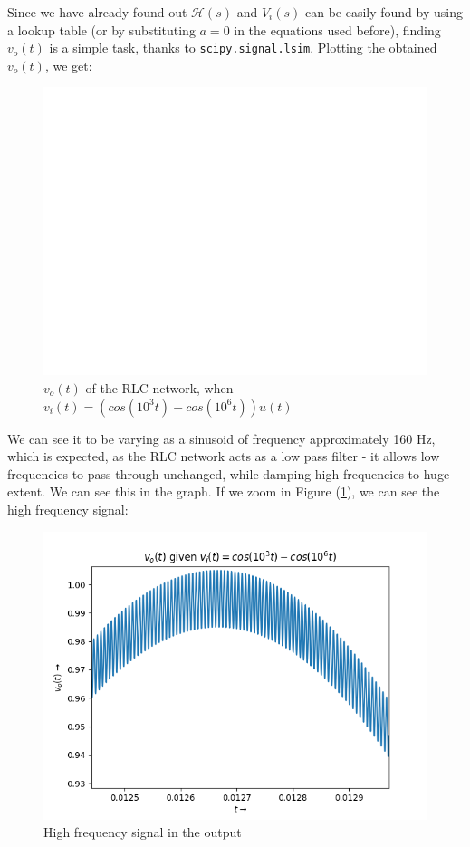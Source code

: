 \documentclass[11pt, a4paper, twoside]{article}
\begin{document}
    Since we have already found out $\mathcal{H}(s)$ and $V_i(s)$ can be easily found by using a lookup table (or by substituting $a=0$ in the equations used before), finding $v_o(t)$ is a simple task, thanks to \texttt{scipy.signal.lsim}. Plotting the obtained $v_o(t)$, we get:
    \begin{figure}[H]
        \centering
        \includegraphics[scale=0.7]{Fig 6(a).png}
        \caption{$v_o(t)$ of the RLC network, when $v_i(t) = (cos(10^3t)-cos(10^6t))u(t)$}
        \label{fig:Fig6a}
    \end{figure}
    
    We can see it to be varying as a sinusoid of frequency approximately 160 Hz, which is expected, as the RLC network acts as a low pass filter - it allows low frequencies to pass through unchanged, while damping high frequencies to huge extent. We can see this in the graph. If we zoom in Figure (\ref{fig:Fig6a}), we can see the high frequency signal:
    \begin{figure}[H]
        \centering
        \includegraphics[scale=0.7]{Fig 6(c).png}
        \caption{High frequency signal in the output}
        \label{fig:Fig6c}
    \end{figure}
    
\end{document}
